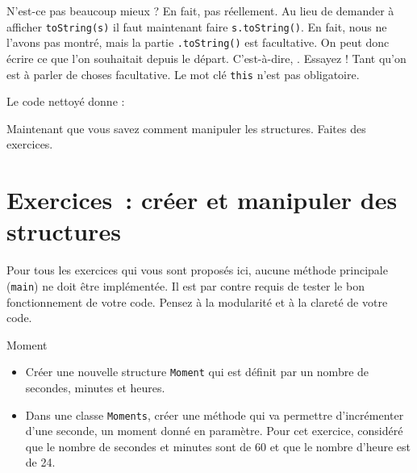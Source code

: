 \documentclass[a4paper,11pt]{article}
\begin{document}

	N'est-ce pas beaucoup mieux ? En fait, pas réellement. Au lieu de demander à afficher \texttt{toString(s)} il faut maintenant faire \texttt{s.toString()}. En fait, nous ne l'avons pas montré, mais la partie \texttt{.toString()} est facultative. On peut donc écrire ce que l'on souhaitait depuis le départ. C'est-à-dire, . Essayez ! Tant qu'on est à parler de choses facultative. Le mot clé \texttt{this} n'est pas obligatoire.

	Le code nettoyé donne :

	Maintenant que vous savez comment manipuler les \og structures\fg. Faites des exercices.


	\clearpage

\section{Exercices~: créer et manipuler des structures}
	
	Pour tous les exercices qui vous sont proposés ici, aucune méthode principale (\texttt{main}) ne doit être implémentée. Il est par contre requis de tester le bon fonctionnement de votre code. Pensez à la modularité et à la clareté de votre code.

	\begin{Exercice}{Moment}
		\begin{itemize}
			\item
				Créer une nouvelle structure \texttt{Moment} qui est définit par un nombre de secondes, minutes et heures.
			\item 
				Dans une classe \texttt{Moments}, créer une méthode qui va permettre d'incrémenter d'une seconde, un moment donné en paramètre. Pour cet exercice, considéré que le nombre de secondes et minutes sont de 60 et que le nombre d'heure est de 24.
		\end{itemize}		
	\end{Exercice}
\end{document}
